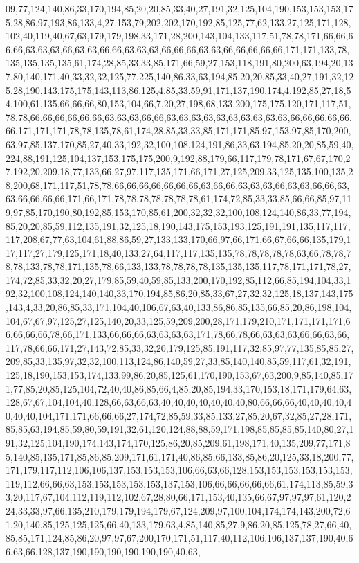 09,77,124,140,86,33,170,194,85,20,20,85,33,40,27,191,32,125,104,190,153,153,153,175,28,86,97,193,86,133,4,27,153,79,202,202,170,192,85,125,77,62,133,27,125,171,128,102,40,119,40,67,63,179,179,198,33,171,28,200,143,104,133,117,51,78,78,171,66,66,66,66,63,63,63,66,63,63,66,66,63,63,63,66,66,66,63,63,66,66,66,66,66,171,171,133,78,135,135,135,135,61,174,28,85,33,33,85,171,66,59,27,153,118,191,80,200,63,194,20,137,80,140,171,40,33,32,32,125,77,225,140,86,33,63,194,85,20,20,85,33,40,27,191,32,125,28,190,143,175,175,143,113,86,125,4,85,33,59,91,171,137,190,174,4,192,85,27,18,54,100,61,135,66,66,66,80,153,104,66,7,20,27,198,68,133,200,175,175,120,171,117,51,78,78,66,66,66,66,66,66,63,63,63,66,66,63,63,63,63,63,63,63,63,63,63,66,66,66,66,66,66,171,171,171,78,78,135,78,61,174,28,85,33,33,85,171,171,85,97,153,97,85,170,200,63,97,85,137,170,85,27,40,33,192,32,100,108,124,191,86,33,63,194,85,20,20,85,59,40,224,88,191,125,104,137,153,175,175,200,9,192,88,179,66,117,179,78,171,67,67,170,27,192,20,209,18,77,133,66,27,97,117,135,171,66,171,27,125,209,33,125,135,100,135,28,200,68,171,117,51,78,78,66,66,66,66,66,66,66,63,66,66,63,63,63,66,63,63,66,66,63,63,66,66,66,66,171,66,171,78,78,78,78,78,78,78,61,174,72,85,33,33,85,66,66,85,97,119,97,85,170,190,80,192,85,153,170,85,61,200,32,32,32,100,108,124,140,86,33,77,194,85,20,20,85,59,112,135,191,32,125,18,190,143,175,153,193,125,191,191,135,117,117,117,208,67,77,63,104,61,88,86,59,27,133,133,170,66,97,66,171,66,67,66,66,135,179,117,117,27,179,125,171,18,40,133,27,64,117,117,135,135,78,78,78,78,78,63,66,78,78,78,78,133,78,78,171,135,78,66,133,133,78,78,78,78,135,135,135,117,78,171,171,78,27,174,72,85,33,32,20,27,179,85,59,40,59,85,133,200,170,192,85,112,66,85,194,104,33,192,32,100,108,124,140,140,33,170,194,85,86,20,85,33,67,27,32,32,125,18,137,143,175,143,4,33,20,86,85,33,171,104,40,106,67,63,40,133,86,86,85,135,66,85,20,86,198,104,104,67,67,97,125,27,125,140,20,33,125,59,209,200,28,171,179,210,171,171,171,171,66,66,66,66,78,66,171,133,66,66,66,63,63,63,63,171,78,66,78,66,63,63,63,66,66,63,66,117,78,66,66,171,27,143,72,85,33,32,20,179,125,85,191,117,32,85,97,77,135,85,85,27,209,85,33,135,97,32,32,100,113,124,86,140,59,27,33,85,140,140,85,59,117,61,32,191,125,18,190,153,153,174,133,99,86,20,85,125,61,170,190,153,67,63,200,9,85,140,85,171,77,85,20,85,125,104,72,40,40,86,85,66,4,85,20,85,194,33,170,153,18,171,179,64,63,128,67,67,104,104,40,128,66,63,66,63,40,40,40,40,40,40,40,80,66,66,66,40,40,40,40,40,40,40,104,171,171,66,66,66,27,174,72,85,59,33,85,133,27,85,20,67,32,85,27,28,171,85,85,63,194,85,59,80,59,191,32,61,120,124,88,88,59,171,198,85,85,85,85,140,80,27,191,32,125,104,190,174,143,174,170,125,86,20,85,209,61,198,171,40,135,209,77,171,85,140,85,135,171,85,86,85,209,171,61,171,40,86,85,66,133,85,86,20,125,33,18,200,77,171,179,117,112,106,106,137,153,153,153,106,66,63,66,128,153,153,153,153,153,153,119,112,66,66,63,153,153,153,153,153,137,153,106,66,66,66,66,66,61,174,113,85,59,33,20,117,67,104,112,119,112,102,67,28,80,66,171,153,40,135,66,67,97,97,97,61,120,224,33,33,97,66,135,210,179,179,194,179,67,124,209,97,100,104,174,174,143,200,72,61,20,140,85,125,125,125,66,40,133,179,63,4,85,140,85,27,9,86,20,85,125,78,27,66,40,85,85,171,124,85,86,20,97,97,67,200,170,171,51,117,40,112,106,106,137,137,190,40,66,63,66,128,137,190,190,190,190,190,190,40,63,